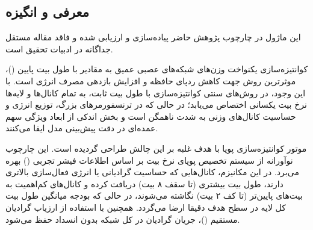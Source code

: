 \subsection{معرفی و انگیزه}
این ماژول در چارچوب پژوهش حاضر پیاده‌سازی و ارزیابی شده و فاقد مقاله مستقل جداگانه در ادبیات تحقیق است.

کوانتیزه‌سازی یکنواخت وزن‌های شبکه‌های عصبی عمیق به مقادیر با طول بیت پایین ()، موثرترین روش جهت کاهش ردپای حافظه و افزایش بازدهی مصرف انرژی است. با این وجود، در روش‌های سنتی کوانتیزه‌سازی با طول بیت ثابت، به تمام کانال‌ها و لایه‌ها نرخ بیت یکسانی اختصاص می‌یابد؛ در حالی که در ترنسفورمرهای بزرگ، توزیع انرژی و حساسیت کانال‌های وزنی به شدت ناهمگن است و بخش اندکی از ابعاد ویژگی سهم عمده‌ای در دقت پیش‌بینی مدل ایفا می‌کنند.

موتور کوانتیزه‌سازی پویا  با هدف غلبه بر این چالش طراحی گردیده است. این چارچوب نوآورانه از سیستم تخصیص پویای نرخ بیت بر اساس اطلاعات فیشر تجربی () بهره می‌برد. در این مکانیزم، کانال‌هایی که حساسیت گرادیانی یا انرژی فعال‌سازی بالاتری دارند، طول بیت بیشتری (تا سقف ۸ بیت) دریافت کرده و کانال‌های کم‌اهمیت به بیت‌های پایین‌تر (تا کف ۲ بیت) نگاشته می‌شوند، در حالی که بودجه میانگین طول بیت کل لایه در سطح هدف دقیقا ارضا می‌گردد. همچنین با استفاده از ارزیاب گرادیان مستقیم ()، جریان گرادیان در کل شبکه بدون انسداد حفظ می‌شود.
